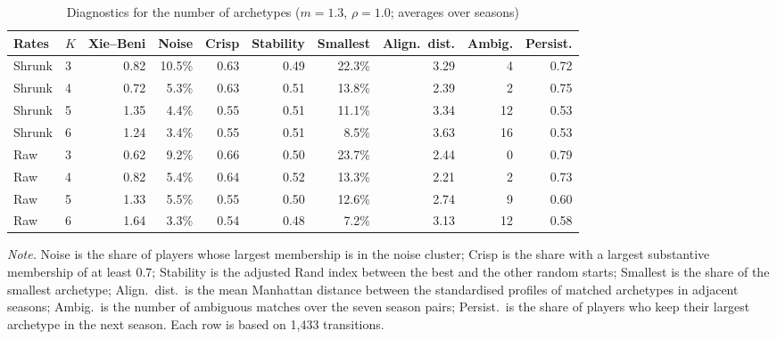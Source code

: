 \begin{table}[ht]
	\centering
	\footnotesize
	\setlength{\tabcolsep}{4pt}
	\caption{Diagnostics for the number of archetypes ($m=1.3$, $\rho=1.0$; averages over seasons)}
	\label{tab:selection}
	\begin{tabular}{llrrrrrrrr}
		\toprule
		Rates & $K$ & Xie--Beni & Noise & Crisp & Stability & Smallest & Align.\ dist. & Ambig. & Persist. \\
		\midrule
Shrunk & 3 & 0.82 & 10.5\% & 0.63 & 0.49 & 22.3\% & 3.29 & 4 & 0.72 \\
Shrunk & 4 & 0.72 & 5.3\% & 0.63 & 0.51 & 13.8\% & 2.39 & 2 & 0.75 \\
Shrunk & 5 & 1.35 & 4.4\% & 0.55 & 0.51 & 11.1\% & 3.34 & 12 & 0.53 \\
Shrunk & 6 & 1.24 & 3.4\% & 0.55 & 0.51 & 8.5\% & 3.63 & 16 & 0.53 \\
Raw & 3 & 0.62 & 9.2\% & 0.66 & 0.50 & 23.7\% & 2.44 & 0 & 0.79 \\
Raw & 4 & 0.82 & 5.4\% & 0.64 & 0.52 & 13.3\% & 2.21 & 2 & 0.73 \\
Raw & 5 & 1.33 & 5.5\% & 0.55 & 0.50 & 12.6\% & 2.74 & 9 & 0.60 \\
Raw & 6 & 1.64 & 3.3\% & 0.54 & 0.48 & 7.2\% & 3.13 & 12 & 0.58 \\
		\bottomrule
	\end{tabular}
	\par\smallskip
	\parbox{0.95\textwidth}{\footnotesize\emph{Note.} Noise is the share of players whose largest membership is in the noise cluster; Crisp is the share with a largest substantive membership of at least 0.7; Stability is the adjusted Rand index between the best and the other random starts; Smallest is the share of the smallest archetype; Align.\ dist.\ is the mean Manhattan distance between the standardised profiles of matched archetypes in adjacent seasons; Ambig.\ is the number of ambiguous matches over the seven season pairs; Persist.\ is the share of players who keep their largest archetype in the next season. Each row is based on 1,433 transitions.}
\end{table}

